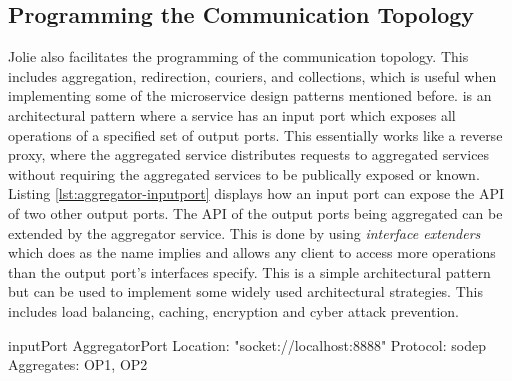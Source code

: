 \subsection{Programming the Communication Topology}
Jolie also facilitates the programming of the communication topology. This includes aggregation, redirection, couriers, and collections, which is useful when 
implementing some of the microservice design patterns mentioned before.
 is an architectural pattern where a service has an input port which exposes all operations of a specified set of output ports. This essentially works like a reverse proxy, where the aggregated service distributes requests to aggregated services without
requiring the aggregated services to be publically exposed or known. Listing \ref{lst:aggregator-inputport} displays how an input port can expose the API of two other output ports.
The API of the output ports being aggregated can be extended by the aggregator service. This is done by using \textit{interface extenders} which does as the name implies and allows any client to access more operations than the output port's interfaces specify.
This is a simple architectural pattern but can be used to implement some widely used architectural strategies. This includes load balancing, caching, encryption and cyber attack prevention.

\begin{jolisting}[][caption={Input port which aggregates requests to some output ports, OP1 and OP2.}, label=lst:aggregator-inputport]
inputPort AggregatorPort {
    Location: "socket://localhost:8888"
    Protocol: sodep
    Aggregates: OP1, OP2
}
\end{jolisting}


